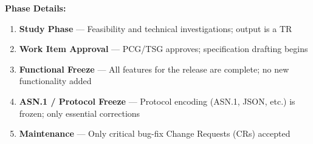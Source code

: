


\CNchained{}


\textbf{Phase Details:}

\begin{enumerate}
\def\labelenumi{\arabic{enumi}.}
\tightlist
\item
  \textbf{Study Phase} — Feasibility and technical investigations; output is a TR
\item
  \textbf{Work Item Approval} — PCG/\allowbreak{}TSG approves; specification drafting begins
\item
  \textbf{Functional Freeze} — All features for the release are complete; no new functionality added
\item
  \textbf{ASN.1 /\allowbreak{} Protocol Freeze} — Protocol encoding (ASN.1, JSON, etc.) is frozen; only essential corrections
\item
  \textbf{Maintenance} — Only critical bug-fix Change Requests (CRs) accepted
\end{enumerate}



